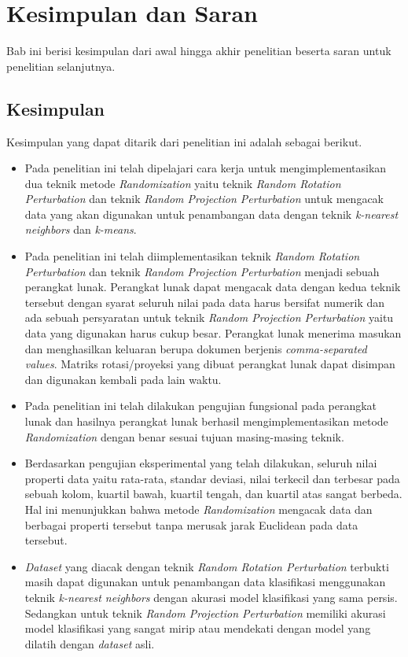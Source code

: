 \chapter{Kesimpulan dan Saran}
\label{chap:kesimpulan-saran}

Bab ini berisi kesimpulan dari awal hingga akhir penelitian beserta saran untuk penelitian selanjutnya.

\section{Kesimpulan}
\label{sec:kesimpulan}

Kesimpulan yang dapat ditarik dari penelitian ini adalah sebagai berikut.
\begin{itemize}
    \item Pada penelitian ini telah dipelajari cara kerja untuk mengimplementasikan dua teknik metode \textit{Randomization} yaitu teknik \textit{Random Rotation Perturbation} dan teknik \textit{Random Projection Perturbation} untuk mengacak data yang akan digunakan untuk penambangan data dengan teknik \textit{k-nearest neighbors} dan \textit{k-means}.
    \item Pada penelitian ini telah diimplementasikan teknik \textit{Random Rotation Perturbation} dan teknik \textit{Random Projection Perturbation} menjadi sebuah perangkat lunak. Perangkat lunak dapat mengacak data dengan kedua teknik tersebut dengan syarat seluruh nilai pada data harus bersifat numerik dan ada sebuah persyaratan untuk teknik \textit{Random Projection Perturbation} yaitu data yang digunakan harus cukup besar. Perangkat lunak menerima masukan dan menghasilkan keluaran berupa dokumen berjenis \textit{comma-separated values}. Matriks rotasi/proyeksi yang dibuat perangkat lunak dapat disimpan dan digunakan kembali pada lain waktu.
    \item Pada penelitian ini telah dilakukan pengujian fungsional pada perangkat lunak dan hasilnya perangkat lunak berhasil mengimplementasikan metode \textit{Randomization} dengan benar sesuai tujuan masing-masing teknik.
    \item Berdasarkan pengujian eksperimental yang telah dilakukan, seluruh nilai properti data yaitu rata-rata, standar deviasi, nilai terkecil dan terbesar pada sebuah kolom, kuartil bawah, kuartil tengah, dan kuartil atas sangat berbeda. Hal ini menunjukkan bahwa metode \textit{Randomization} mengacak data dan berbagai properti tersebut tanpa merusak jarak Euclidean pada data tersebut.
    \item \textit{Dataset} yang diacak dengan teknik \textit{Random Rotation Perturbation} terbukti masih dapat digunakan untuk penambangan data klasifikasi menggunakan teknik \textit{k-nearest neighbors} dengan akurasi model klasifikasi yang sama persis. Sedangkan untuk teknik \textit{Random Projection Perturbation} memiliki akurasi model klasifikasi yang sangat mirip atau mendekati dengan model yang dilatih dengan \textit{dataset} asli.

\end{itemize}
